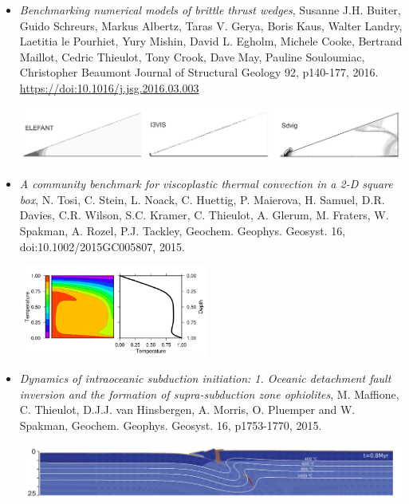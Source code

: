 \begin{itemize}
\item {\it Benchmarking numerical models of brittle thrust wedges}, 
Susanne J.H. Buiter, Guido Schreurs, Markus Albertz, Taras V. Gerya, Boris Kaus,
Walter Landry, Laetitia le Pourhiet, Yury Mishin, David L. Egholm, Michele Cooke,
Bertrand Maillot, Cedric Thieulot, Tony Crook, Dave May, Pauline Souloumiac, Christopher Beaumont
Journal of Structural Geology 92, p140-177, 2016. \url{https://doi:10.1016/j.jsg.2016.03.003}

\begin{center}
\includegraphics[height=1.8cm]{images/mycodes/busa16_img}
\end{center}


\item {\it A community benchmark for viscoplastic thermal convection in a 2-D square box}, 
N. Tosi, C. Stein, L. Noack, C. Huettig, P. Maierova, H. Samuel, D.R. Davies, C.R. Wilson, S.C. Kramer, C. Thieulot, A. Glerum, M. Fraters, W. Spakman, A. Rozel, P.J. Tackley, Geochem. Geophys. Geosyst. 16, doi:10.1002/2015GC005807, 2015.

\begin{center}
\includegraphics[height=3cm]{images/mycodes/tosn15_img}
\end{center}


\item {\it Dynamics of intraoceanic subduction initiation: 1. Oceanic detachment fault inversion and the formation of supra-subduction zone ophiolites}, M. Maffione, C. Thieulot, D.J.J. van Hinsbergen, A. Morris, O. Pluemper and W. Spakman, Geochem. Geophys. Geosyst. 16, p1753-1770, 2015.

\begin{center}
\includegraphics[height=1.8cm]{images/mycodes/matv15_img}
\end{center}




\end{itemize}


